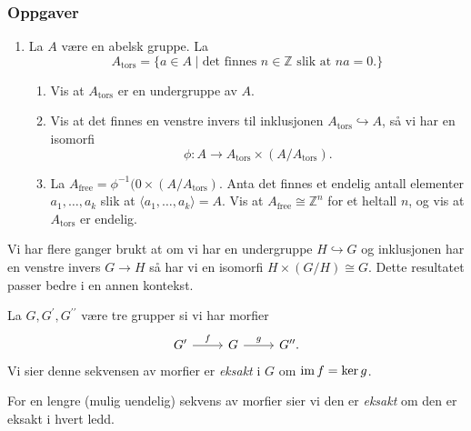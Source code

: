 \subsubsection*{Oppgaver}
\begin{enumerate}
    \item La $A$ være en abelsk gruppe. La
        \[
            A_{\mathrm{tors}} = \{a\in A\mid \mbox{det finnes $n\in \mathbb Z$ slik at $na = 0$.}\}
        \]
        \begin{enumerate}
            \item Vis at $A_{\mathrm{tors}}$ er en undergruppe av $A$.
            \item Vis at det finnes en venstre invers til inklusjonen
                $A_{\mathrm{tors}}\hookrightarrow A$,
                så vi har en isomorfi
                \[
                    \phi \colon A\to A_{\mathrm{tors}}\times (A / A_{\mathrm{tors}}).
                \]
            \item La $A_{\mathrm{free}} = \phi^{-1}(0\times (A / A_{\mathrm{tors}})$.
                Anta det finnes et endelig antall elementer $a_1,\dots,a_k$
                slik at $\langle a_1,\dots, a_k\rangle = A$.
                Vis at $A_{\mathrm{free}} \cong \mathbb Z^n$ for et heltall $n$,
                og vis at $A_{\mathrm{tors}}$ er endelig.
        \end{enumerate}
\end{enumerate}
Vi har flere ganger brukt at om vi har en undergruppe
$H\hookrightarrow G$ og inklusjonen har en venstre invers
$G\to H$ så har vi en isomorfi $H\times (G / H)\cong G$.
Dette resultatet passer bedre i en annen kontekst.
\begin{definition}
    La $G, G^\prime, G^{\prime\prime}$ være tre grupper
    si vi har morfier
    \[\begin{tikzcd}
        G^\prime
        \rar{f}
        &
        G
        \rar{g}
        &
        G^{\prime\prime}.
    \end{tikzcd}\]
    Vi sier denne sekvensen av morfier er \textit{eksakt} i $G$
    om $\operatorname{im} f = \ker g$.

    For en lengre (mulig uendelig) sekvens av morfier
    sier vi den er \textit{eksakt}
    om den er eksakt i hvert ledd.
\end{definition}
